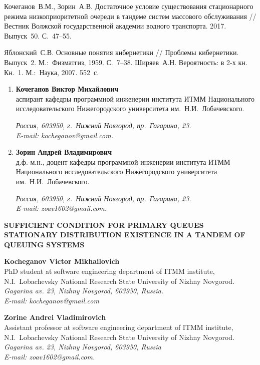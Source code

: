 \documentclass[a4paper,twoside]{article}
\theoremstyle{theorem}
\theoremstyle{remark}
\begin{document}
\begin{thebibliography}{99}
 Кочеганов~В.М., Зорин~А.В. Достаточное условие существования стационарного режима низкоприоритетной очереди в тандеме систем массового обслуживания // Вестник Волжской государственной академии водного транспорта. 2017. Выпуск~50. С.~47–55.

 Яблонский~С.В. Основные понятия кибернетики // Проблемы кибернетики. Выпуск~2. М.:~Физматгиз, 1959. С.~7–38.
 Ширяев~А.Н. Вероятность: в 2-х кн. Кн.~1. М.:~Наука, 2007. 552~с.


\end{thebibliography}
\newpage
\bigskip{}
\begin{enumerate}[1.]
\item {\bf Кочеганов Виктор Михайлович}\\
аспирант кафедры программной инженерии института ИТММ Национального исследовательского Нижегородского университета им.~Н.И.~Лобачевского.

\vspace{1mm}
{\it Россия, 603950, г.~Нижний Новгород, пр.~Гагарина, 23.\\ E-mail: kocheganov@gmail.com.} 
\item {\bf Зорин Андрей Владимирович}\\
д.ф.-м.н., доцент кафедры программной инженерии института ИТММ Национального исследовательского Нижегородского университета им.~Н.И.~Лобачевского.

\vspace{1mm}
{\it Россия, 603950, г.~Нижний Новгород, пр.~Гагарина, 23.\\ E-mail: zoav1602@gmail.com.} 
\end{enumerate} 

\newpage
\thispagestyle{plain}
\begin{center}
{\bf SUFFICIENT CONDITION FOR PRIMARY QUEUES STATIONARY DISTRIBUTION EXISTENCE IN A TANDEM OF QUEUING SYSTEMS}
\vspace{4mm}\par
{\bf Kocheganov Victor Mikhailovich}\\
PhD student at software engineering department of ITMM institute,\\ N.I.~Lobachevsky National Research State University of Nizhny Novgorod.\\
{\it Gagarina av. 23, Nizhny Novgorod, 603950, Russia.\\ E-mail: kocheganov@gmail.com}\\ \vspace{2mm}

{\bf Zorine Andrei Vladimirovich}\\
 Assistant professor at software engineering department of ITMM institute,\\
N.I.~Lobachevsky National Research State University of Nizhny Novgorod.\\
{\it  Gagarina av. 23, Nizhny Novgorod, 603950, Russia\\ E-mail: zoav1602@gmail.com.}  
\end{center}
\vspace{2mm}\par
\end{document}
